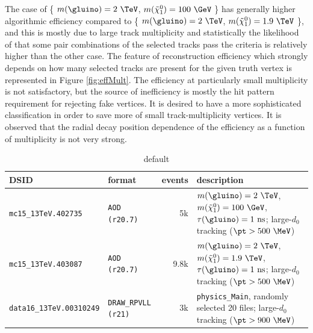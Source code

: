\documentclass[NOTE, atlasdraft=true, texlive=2018, UKenglish]{\ATLASLATEXPATH atlasdoc}
\begin{document}
The case of \{ $m(\gluino) = 2~\TeV$, $m(\tilde{\chi}_{1}^{0}) = 100~\GeV$ \} has generally higher algorithmic efficiency compared to \{ $m(\gluino) = 2~\TeV$, $m(\tilde{\chi}_{1}^{0}) = 1.9~\TeV$ \}, and this is mostly due to large track multiplicity and statistically the likelihood of that some pair combinations of the selected tracks pass the criteria is relatively higher than the other case. The feature of reconstruction efficiency which strongly depends on how many selected tracks are present for the given truth vertex is represented in Figure \ref{fig:effMult}. The efficiency at particularly small multiplicity is not satisfactory, but the source of inefficiency is mostly the hit pattern requirement for rejecting fake vertices. It is desired to have a more sophisticated classification in order to save more of small track-multiplicity vertices. It is observed that the radial decay position dependence of the efficiency as a function of multiplicity is not very strong.

\begin{table}[tbp]
\caption{default}
\centering
\scriptsize
\begin{tabular}{llrp{9.6cm}}
\hline
\hline
DSID & format & events & description\\
\hline
{\tt mc15\_13TeV.402735}& {\tt AOD (r20.7)} & 5k   & $m(\gluino) = 2~\TeV$, $m(\tilde{\chi}_{1}^{0}) = 100~\GeV$, $\tau(\gluino) = 1~{\rm ns}$; large-$d_{0}$ tracking ($\pt > 500~\MeV$)\\
{\tt mc15\_13TeV.403087}& {\tt AOD (r20.7)} & 9.8k & $m(\gluino) = 2~\TeV$, $m(\tilde{\chi}_{1}^{0}) = 1.9~\TeV$, $\tau(\gluino) = 1~{\rm ns}$; large-$d_{0}$ tracking ($\pt > 500~\MeV$)\\
{\tt data16\_13TeV.00310249} & {\tt DRAW\_RPVLL (r21)} & 3k  & {\tt physics\_Main}, randomly selected 20 files; large-$d_{0}$ tracking ($\pt > 900~\MeV$)\\
\hline
\hline
\end{tabular}
\label{tbl:mc_samples}
\end{table}%
\end{document}
